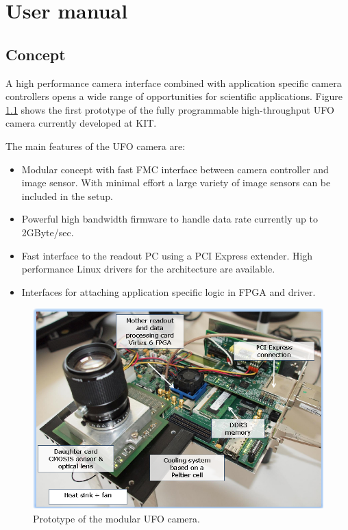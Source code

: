 %

\chapter{User manual}

\section{Concept}

A high performance camera interface combined with application specific camera controllers opens 
a wide range of opportunities for scientific applications. Figure \ref{camera-setup} shows the first 
prototype of the fully programmable high-throughput UFO camera currently developed at KIT. 

The main features of the UFO camera are:

\begin{itemize}
\item Modular concept with fast FMC interface between camera controller and image sensor. With minimal effort a large variety of image sensors can be included in the setup.
\item Powerful high bandwidth firmware to handle data rate currently up to 2GByte/sec.
\item Fast interface to the readout PC using a PCI Express extender. High performance Linux drivers for the architecture are available.
\item Interfaces for attaching application specific logic in FPGA and driver.
\end{itemize}

\begin{figure}
\includegraphics[width=\textwidth]{images/Figure_2.png}
\caption{\label{camera-setup} Prototype of the modular UFO camera.}
\end{figure}




